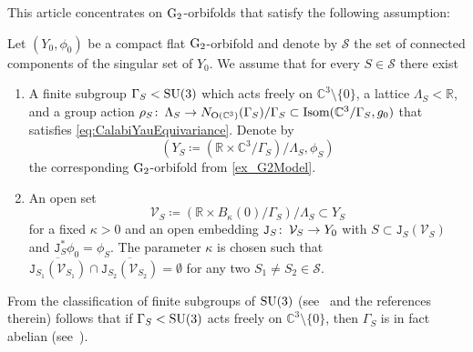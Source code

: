 \documentclass[11pt,a4paper]{scrartcl}
\newcommand{\col}{\colon \thinspace}
\newcommand{\G}{\textup{G}}
\renewcommand{\O}{\textup{O}}
\newcommand{\SU}{\textup{SU}}
\numberwithin{equation}{section}
\theoremstyle{plain}
\theoremstyle{definition}
\theoremstyle{remark}
\begin{document}
This article concentrates on $\G_2$-orbifolds that satisfy the following assumption:

\begin{assumption}\label{Ass:Codim6Singularities}
Let $(Y_0,\phi_0)$ be a compact flat $\G_2$-orbifold and denote by $\mathcal{S}$ the set of connected components of the singular set of $Y_0$. We assume that for every $S \in \mathcal{S}$ there exist
\begin{enumerate}
\item A finite subgroup $\Gamma_S < \SU(3)$ which acts freely on $\mathbb{C}^3\setminus\{0\}$, a lattice $\Lambda_S< \mathbb{R}$, and a group action $\rho_S \col \Lambda_S \to N_{\O(\mathbb{C}^3)}(\Gamma_S)/\Gamma_S \subset \textup{Isom}(\mathbb{C}^3/\Gamma_S,g_0)$ that satisfies \eqref{eq:CalabiYauEquivariance}. Denote by \[(Y_S \coloneqq (\mathbb{R} \times \mathbb{C}^3/\Gamma_S)/\Lambda_S,\phi_S)\] the corresponding $\G_2$-orbifold from \autoref{ex_G2Model}. 
\item An open set \[ \mathcal{V}_{S} \coloneqq (\mathbb{R} \times B_{\kappa}(0)/\Gamma_S)/\Lambda_S \subset Y_S \] for a fixed $\kappa>0$ and an open embedding $\mathtt{J}_S \col \mathcal{V}_{S} \to Y_0$ with $S \subset \mathtt{J}_S(\mathcal{V}_{S})$ and $\mathtt{J}_S^*\phi_0 = \phi_S$. The parameter $\kappa$ is chosen such that $\overline{\mathtt{J}_{S_1}(\mathcal{V}_{S_1})}\cap \overline{\mathtt{J}_{S_2}(\mathcal{V}_{S_2})} = \emptyset $ for any two $S_1 \neq S_2 \in \mathcal{S}$.
\end{enumerate}
\end{assumption}
\begin{remark}\label{rem: finite subgroups of SU(3)}
From the classification of finite subgroups of $\SU(3)$ (see~\cite[Chapter~1]{YauYung-3D_Gorenstein_singularities} and the references therein) follows that if $\Gamma_S<\SU(3)$ acts freely on $\mathbb{C}^3\setminus \{0\}$, then $\Gamma_S$ is in fact abelian (see~\cite[Theorem~23]{YauYung-3D_Gorenstein_singularities}).
\end{remark}
\end{document}
